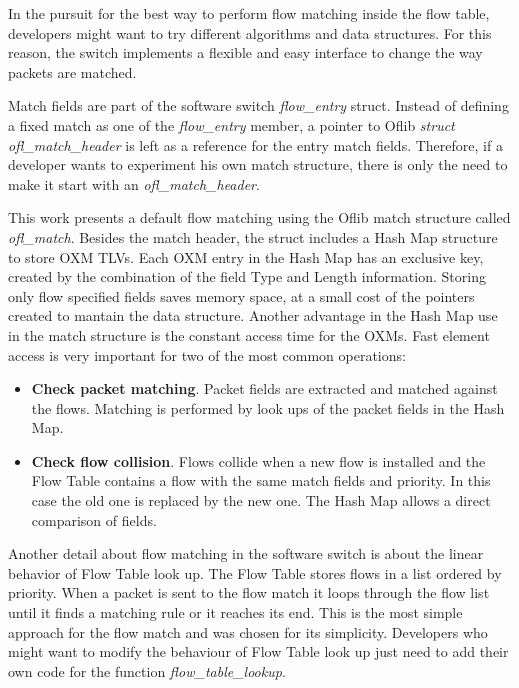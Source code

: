     In the pursuit for the best way to perform flow matching inside the flow table, developers might want to try different algorithms and data structures. For this reason, the switch implements a flexible and easy interface to change the way packets are matched. 
    
    Match fields are part of the software switch \textit{flow_entry} struct. Instead of defining a fixed match as one of the \textit{flow_entry} member, a pointer to Oflib \textit{struct ofl_match_header} is left as a reference for the entry match fields. Therefore, if a developer wants to experiment his own match structure, there is only the need to make it start with an \textit{ ofl_match_header}.    

    This work presents a default flow matching using the Oflib match structure called \textit{ofl_match}. Besides the match header, the struct includes a Hash Map structure to store OXM TLVs. Each OXM entry in the Hash Map has an  exclusive key, created by the combination of the field Type and Length information. Storing only flow specified fields saves memory space, at a small cost of the pointers created to mantain the data structure. Another advantage in the Hash Map use in the match structure is the constant access time for the OXMs. Fast element access is very important for two of the most common operations:
    
    \begin{itemize}
    \item \textbf{Check packet matching}. Packet fields are extracted and matched against the flows. Matching is performed by look ups of the packet fields in the Hash Map.        
    
    \item \textbf{Check flow collision}. Flows collide when a new flow is installed and the Flow Table contains a flow with the same match fields and priority. In this case the old one is replaced by the new one. The Hash Map allows a direct comparison of fields.
    \end{itemize}

    Another detail about flow matching in the software switch is about the linear behavior of Flow Table look up. The Flow Table stores flows in a list ordered by priority. When a packet is sent to the flow match it loops through the flow list until it finds a matching rule or it reaches its end. This is the most simple approach for the flow match and was chosen for its simplicity. Developers who might want to modify the behaviour of Flow Table look up just need to add their own code for the function \textit{flow_table_lookup}.
         
